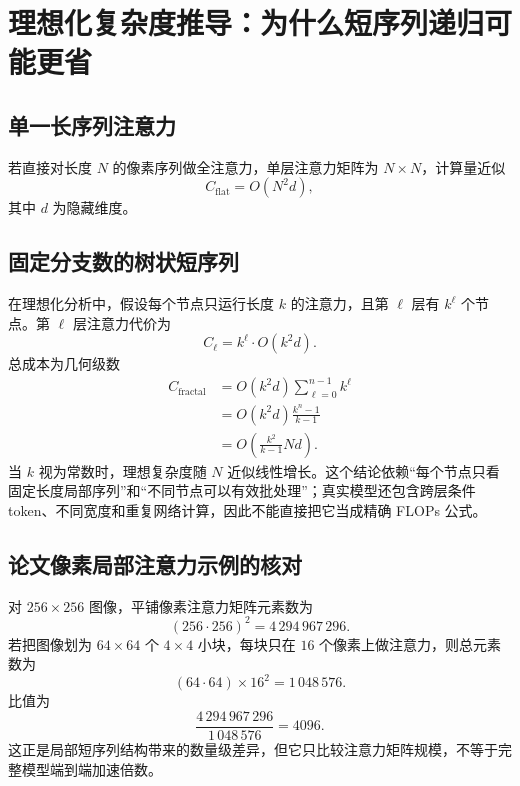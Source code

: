 \documentclass[UTF8,12pt,a4paper,fontset=none]{ctexart}
\numberwithin{equation}{section}
\begin{document}
\section{理想化复杂度推导：为什么短序列递归可能更省}
\subsection{单一长序列注意力}
若直接对长度 $N$ 的像素序列做全注意力，单层注意力矩阵为 $N\times N$，计算量近似
\begin{equation}
 C_{\mathrm{flat}}=O(N^2d),
\end{equation}
其中 $d$ 为隐藏维度。

\subsection{固定分支数的树状短序列}
在理想化分析中，假设每个节点只运行长度 $k$ 的注意力，且第 $\ell$ 层有 $k^\ell$ 个节点。第 $\ell$ 层注意力代价为
\begin{equation}
 C_\ell=k^\ell\cdot O(k^2d).
\end{equation}
总成本为几何级数
\begin{align}
 C_{\mathrm{fractal}}
 &=O(k^2d)\sum_{\ell=0}^{n-1}k^\ell\\
 &=O(k^2d)\frac{k^n-1}{k-1}\\
 &=O\!\left(\frac{k^2}{k-1}Nd\right).
\end{align}
当 $k$ 视为常数时，理想复杂度随 $N$ 近似线性增长。这个结论依赖“每个节点只看固定长度局部序列”和“不同节点可以有效批处理”；真实模型还包含跨层条件 token、不同宽度和重复网络计算，因此不能直接把它当成精确 FLOPs 公式。

\subsection{论文像素局部注意力示例的核对}
对 $256\times256$ 图像，平铺像素注意力矩阵元素数为
\begin{equation}
 (256\cdot256)^2=4\,294\,967\,296.
\end{equation}
若把图像划为 $64\times64$ 个 $4\times4$ 小块，每块只在 $16$ 个像素上做注意力，则总元素数为
\begin{equation}
 (64\cdot64)\times16^2=1\,048\,576.
\end{equation}
比值为
\begin{equation}
 \frac{4\,294\,967\,296}{1\,048\,576}=4096.
\end{equation}
这正是局部短序列结构带来的数量级差异，但它只比较注意力矩阵规模，不等于完整模型端到端加速倍数。
\end{document}
